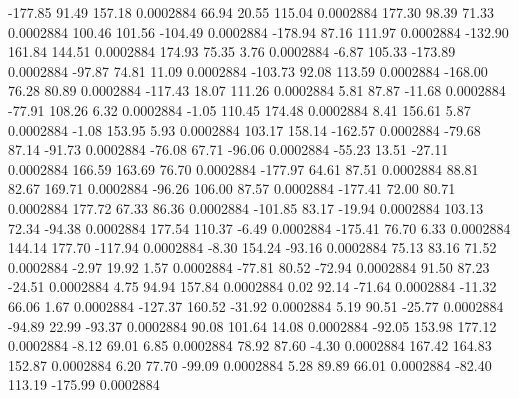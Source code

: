      -177.85       91.49      157.18     0.0002884
       66.94       20.55      115.04     0.0002884
      177.30       98.39       71.33     0.0002884
      100.46      101.56     -104.49     0.0002884
     -178.94       87.16      111.97     0.0002884
     -132.90      161.84      144.51     0.0002884
      174.93       75.35        3.76     0.0002884
       -6.87      105.33     -173.89     0.0002884
      -97.87       74.81       11.09     0.0002884
     -103.73       92.08      113.59     0.0002884
     -168.00       76.28       80.89     0.0002884
     -117.43       18.07      111.26     0.0002884
        5.81       87.87      -11.68     0.0002884
      -77.91      108.26        6.32     0.0002884
       -1.05      110.45      174.48     0.0002884
        8.41      156.61        5.87     0.0002884
       -1.08      153.95        5.93     0.0002884
      103.17      158.14     -162.57     0.0002884
      -79.68       87.14      -91.73     0.0002884
      -76.08       67.71      -96.06     0.0002884
      -55.23       13.51      -27.11     0.0002884
      166.59      163.69       76.70     0.0002884
     -177.97       64.61       87.51     0.0002884
       88.81       82.67      169.71     0.0002884
      -96.26      106.00       87.57     0.0002884
     -177.41       72.00       80.71     0.0002884
      177.72       67.33       86.36     0.0002884
     -101.85       83.17      -19.94     0.0002884
      103.13       72.34      -94.38     0.0002884
      177.54      110.37       -6.49     0.0002884
     -175.41       76.70        6.33     0.0002884
      144.14      177.70     -117.94     0.0002884
       -8.30      154.24      -93.16     0.0002884
       75.13       83.16       71.52     0.0002884
       -2.97       19.92        1.57     0.0002884
      -77.81       80.52      -72.94     0.0002884
       91.50       87.23      -24.51     0.0002884
        4.75       94.94      157.84     0.0002884
        0.02       92.14      -71.64     0.0002884
      -11.32       66.06        1.67     0.0002884
     -127.37      160.52      -31.92     0.0002884
        5.19       90.51      -25.77     0.0002884
      -94.89       22.99      -93.37     0.0002884
       90.08      101.64       14.08     0.0002884
      -92.05      153.98      177.12     0.0002884
       -8.12       69.01        6.85     0.0002884
       78.92       87.60       -4.30     0.0002884
      167.42      164.83      152.87     0.0002884
        6.20       77.70      -99.09     0.0002884
        5.28       89.89       66.01     0.0002884
      -82.40      113.19     -175.99     0.0002884
